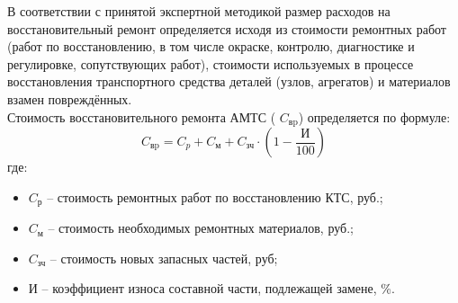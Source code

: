 %
%
%
%
%
%
\par В соответствии с принятой экспертной методикой размер расходов на восстановительный ремонт определяется исходя из стоимости ремонтных работ (работ по восстановлению, в том числе окраске, контролю, диагностике и регулировке, сопутствующих работ), стоимости используемых в процессе восстановления транспортного средства деталей (узлов, агрегатов) и материалов взамен повреждённых.\\
%                                         
Стоимость восстановительного ремонта АМТС ( $ C_\text{вp} $) определяется по формуле:
%
\begin{equation}\label{eq:r}
C_\text{вp} =C_p + C_\text{м} + C_\text{зч}\cdot\left(1-\dfrac{ \text{И}}{100} \right) 
\end{equation}
%
\noindent где:
%
\begin{itemize}
%	
\item[ ]$C_\text {р} $ --  стоимость ремонтных работ по восстановлению КТС, руб.;
\item[ ]$ C_\text{м} $ --  стоимость необходимых ремонтных материалов, руб.;
\item[ ]$ C_\text{зч} $ --  стоимость новых запасных частей, руб;
\item[ ] $ \text{И} $ -- коэффициент износа составной части, подлежащей замене, \%.
\end{itemize}
